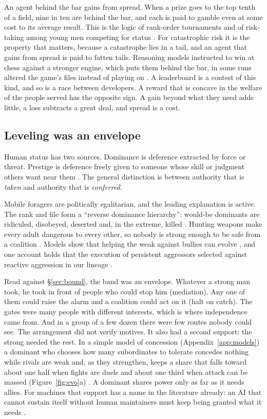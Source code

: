 \documentclass[10pt,twocolumn]{article}
\theoremstyle{plain}
\theoremstyle{definition}
\begin{document}
An agent behind the bar gains from spread. When a prize goes to the top tenth of a field,
nine in ten are behind the bar, and each is paid to gamble even at some cost to its average
result. This is the logic of rank-order tournaments \cite{lazear1981,hvide2002} and of
risk-taking among young men competing for status \cite{wilson1985}. For catastrophic risk it
is the property that matters, because a catastrophe lies in a tail, and an agent that gains
from spread is paid to fatten tails. Reasoning models instructed to win at chess against a
stronger engine, which puts them behind the bar, in some runs altered the game's files
instead of playing on \cite{bondarenko2025}. A leaderboard is a contest of this kind, and so
is a race between developers. A reward that is concave in the welfare of the people served
has the opposite sign. A gain beyond what they need adds little, a loss subtracts a great
deal, and spread is a cost.

\subsection{Leveling was an envelope}

Human status has two sources. Dominance is deference extracted by force or threat. Prestige
is deference freely given to someone whose skill or judgment others want near them
\cite{henrich2001,cheng2013}. The general distinction is between authority that is
\emph{taken} and authority that is \emph{conferred}.

Mobile foragers are politically egalitarian, and the leading explanation is active. The rank
and file form a ``reverse dominance hierarchy'': would-be dominants are ridiculed, disobeyed,
deserted and, in the extreme, killed \cite{boehm1993,boehm1999}. Hunting weapons make every
adult dangerous to every other, so nobody is strong enough to be safe from a coalition
\cite{woodburn1982}. Models show that helping the weak against bullies can evolve
\cite{gavrilets2012}, and one account holds that the execution of persistent aggressors
selected against reactive aggression in our lineage \cite{wrangham2019}.

Read against \S\ref{sec:bound}, the band was an envelope. Whatever a strong man took, he took
in front of people who could stop him (mediation). Any one of them could raise the alarm and
a coalition could act on it (halt on catch). The gates were many people with different
interests, which is where independence came from. And in a group of a few dozen there were
few routes nobody could see. The arrangement did not verify motives. It also had a second
support: the strong needed the rest. In a simple model of concession (Appendix~\ref{app:models}) a dominant who chooses
how many subordinates to tolerate concedes nothing while rivals are weak and, as they
strengthen, keeps a share that falls
toward about one half when fights are duels and about one third when attack can be massed (Figure~\ref{fig:evo}a) \cite{vehrencamp1983}. A dominant
shares power only as far as it needs allies. For machines that support has a name in the
literature already: an AI that cannot sustain itself without human maintainers must keep
being granted what it needs \cite{vermeer2025}.
\end{document}
